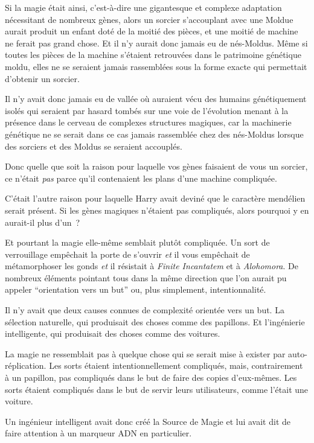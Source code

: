 Si la magie était ainsi, c'est-à-dire une gigantesque et complexe adaptation nécessitant de nombreux gènes, alors un sorcier s'accouplant avec une Moldue aurait produit un enfant doté de la moitié des pièces, et une moitié de machine ne ferait pas grand chose. Et il n'y aurait donc jamais eu de nés-Moldus. Même si toutes les pièces de la machine s'étaient retrouvées dans le patrimoine génétique moldu, elles ne se seraient jamais rassemblées sous la forme exacte qui permettait d'obtenir un sorcier.

Il n'y avait donc jamais eu de vallée où auraient vécu des humains génétiquement isolés qui seraient par hasard tombés sur une voie de l'évolution menant à la présence dans le cerveau de complexes structures magiques, car la machinerie génétique ne se serait dans ce cas jamais rassemblée chez des nés-Moldus lorsque des sorciers et des Moldus se seraient accouplés.

Donc quelle que soit la raison pour laquelle vos gènes faisaient de vous un sorcier, ce n'était \emph{pas} parce qu'il contenaient les plans d'une machine compliquée.

C'était l'autre raison pour laquelle Harry avait deviné que le caractère mendélien serait présent. Si les gènes magiques n'étaient pas compliqués, alors pourquoi y en aurait-il plus d'un~?

Et pourtant la magie elle-même semblait plutôt compliquée. Un sort de verrouillage empêchait la porte de s'ouvrir \emph{et} il vous empêchait de métamorphoser les gonds \emph{et} il résistait à \emph{Finite Incantatem} et à \emph{Alohomora}. De nombreux éléments pointant tous dans la même direction que l'on aurait pu appeler “orientation vers un but” ou, plus simplement, intentionnalité.

Il n'y avait que deux causes connues de complexité orientée vers un but. La sélection naturelle, qui produisait des choses comme des papillons. Et l'ingénierie intelligente, qui produisait des choses comme des voitures.

La magie ne ressemblait pas à quelque chose qui se serait mise à exister par auto-réplication. Les sorts étaient intentionnellement compliqués, mais, contrairement à un papillon, pas compliqués dans le but de faire des copies d'eux-mêmes. Les sorts étaient compliqués dans le but de servir leurs utilisateurs, comme l'était une voiture.

Un ingénieur intelligent avait donc créé la Source de Magie et lui avait dit de faire attention à un marqueur ADN en particulier.

